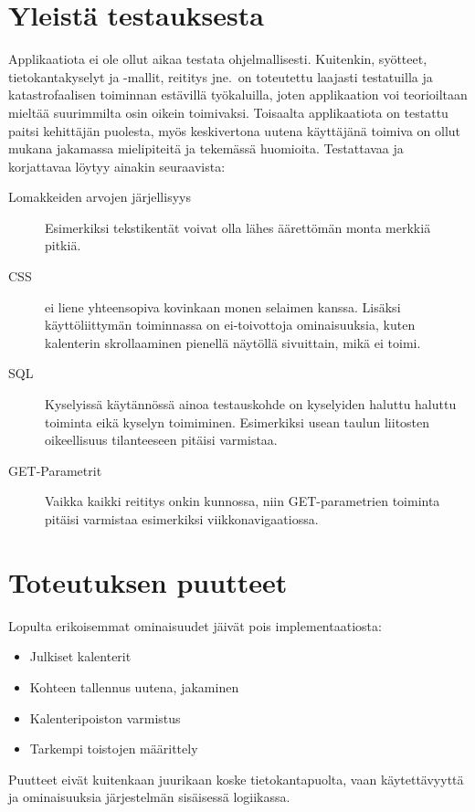 \documentclass[a4paper,12pt]{report}
\begin{document}
\section*{Yleistä testauksesta}
Applikaatiota ei ole ollut aikaa testata ohjelmallisesti. Kuitenkin, syötteet,
tietokantakyselyt ja -mallit, reititys jne.\ on toteutettu laajasti testatuilla
ja katastrofaalisen toiminnan estävillä työkaluilla, joten applikaation voi
teorioiltaan mieltää suurimmilta osin oikein toimivaksi. Toisaalta applikaatiota
on testattu paitsi kehittäjän puolesta, myös keskivertona uutena käyttäjänä
toimiva on ollut mukana jakamassa mielipiteitä ja tekemässä huomioita.
Testattavaa ja korjattavaa löytyy ainakin seuraavista:
\begin{description}
   \item[Lomakkeiden arvojen järjellisyys] Esimerkiksi tekstikentät voivat olla
      lähes äärettömän monta merkkiä pitkiä.
   \item[CSS] ei liene yhteensopiva kovinkaan monen selaimen kanssa. Lisäksi
      käyttöliittymän toiminnassa on ei-toivottoja ominaisuuksia, kuten
      kalenterin skrollaaminen pienellä näytöllä sivuittain, mikä ei toimi.
   \item[SQL] Kyselyissä käytännössä ainoa testauskohde on kyselyiden haluttu
      haluttu toiminta eikä kyselyn toimiminen. Esimerkiksi usean taulun
      liitosten oikeellisuus tilanteeseen pitäisi varmistaa.
   \item[GET-Parametrit] Vaikka kaikki reititys onkin kunnossa, niin
      GET-parametrien toiminta pitäisi varmistaa esimerkiksi
      viikkonavigaatiossa.
\end{description}

\section*{Toteutuksen puutteet}
Lopulta erikoisemmat ominaisuudet jäivät pois implementaatiosta:
\begin{itemize}
      \item Julkiset kalenterit
      \item Kohteen tallennus uutena, jakaminen
      \item Kalenteripoiston varmistus
      \item Tarkempi toistojen määrittely
\end{itemize}
Puutteet eivät kuitenkaan juurikaan koske tietokantapuolta, vaan käytettävyyttä
ja ominaisuuksia järjestelmän sisäisessä logiikassa.
\end{document}

